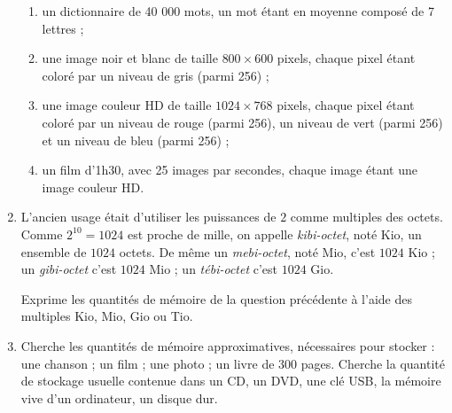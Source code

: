 \documentclass[class=report,crop=false, 12pt]{standalone}
\begin{document}
\begin{activite}
\begin{enumerate}
\begin{enumerate}
    \item un dictionnaire de 40 000 mots, un mot étant en moyenne composé de 7 lettres ;
    
    \item une image noir et blanc de taille $800 \times 600$ pixels, chaque pixel étant coloré par un niveau de gris (parmi 256) ;
    
    \item  une image couleur HD de taille $1024 \times 768$ pixels, chaque pixel étant coloré par un niveau de rouge (parmi 256), un niveau de vert (parmi 256) et un niveau de bleu  (parmi 256) ;
  
    \item un film d'1h30, avec 25 images par secondes, chaque image étant une image couleur HD.     
    
  \end{enumerate}  

 
  
  \item L'ancien usage était d'utiliser les puissances de $2$ comme multiples des octets.
  Comme $2^{10}= 1024$ est proche de mille, on appelle \emph{kibi-octet}, noté Kio, un ensemble de $1024$ octets. 
  De même un \emph{mebi-octet}, noté Mio, c'est $1024$ Kio ; un \emph{gibi-octet} c'est $1024$ Mio ;
  un \emph{tébi-octet} c'est $1024$ Gio.
  
  Exprime les quantités de mémoire de la question précédente à l'aide des multiples Kio, Mio, Gio ou Tio.
  
  \item Cherche les quantités de mémoire approximatives, nécessaires pour stocker : une chanson ; un film ;
  une photo ;  un livre de 300 pages. Cherche la quantité de stockage usuelle contenue dans 
  un CD, un DVD, une clé USB, la mémoire vive d'un ordinateur, un disque dur.  

\end{enumerate}
\end{activite}
\end{document}
